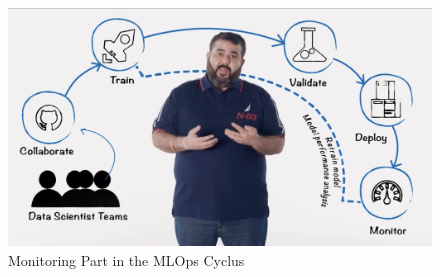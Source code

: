 \begin{figure}[H]
	\centering
	\includegraphics[scale = 0.1]{attachment/chapter_10/Scc025}
	\caption{Monitoring Part in the MLOps Cyclus}
\end{figure}

